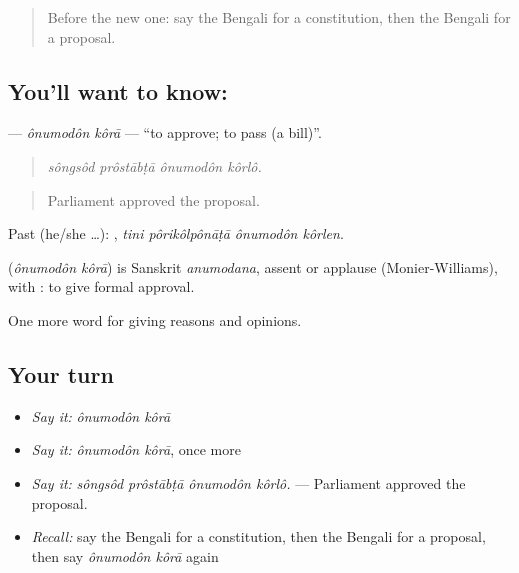 \label{lesson:BN-C345-onumodon-kora}



\begin{quote}
Before the new one: say the Bengali for a constitution, then the Bengali for a proposal.
\end{quote}

\subsection*{You'll want to know:  }
\textbf{ } — \emph{ônumodôn kôrā} — \textquotedblleft{}to approve; to pass (a bill)\textquotedblright{}.

\begin{quote}
   
\end{quote}

\begin{quote}
\emph{sôngsôd prôstābṭā ônumodôn kôrlô.}
\end{quote}

\begin{quote}
Parliament approved the proposal.
\end{quote}

Past (he/she …):    , \emph{tini pôrikôlpônāṭā ônumodôn kôrlen}.

\begin{cousinweb}
\textbf{ } (\emph{ônumodôn kôrā}) is Sanskrit \emph{anumodana}, assent or applause (Monier-Williams), with : to give formal approval.
\end{cousinweb}

\begin{grammarlens}[title={What you've built}]
One more word for giving reasons and opinions.
\end{grammarlens}

\subsection*{Your turn}
\begin{itemize}
\raggedright
  \item \emph{Say it:} \emph{ônumodôn kôrā}
  \item \emph{Say it:} \emph{ônumodôn kôrā}, once more
  \item \emph{Say it:} \emph{sôngsôd prôstābṭā ônumodôn kôrlô.} — Parliament approved the proposal.
  \item \emph{Recall:} say the Bengali for a constitution, then the Bengali for a proposal, then say \emph{ônumodôn kôrā} again
\end{itemize}

